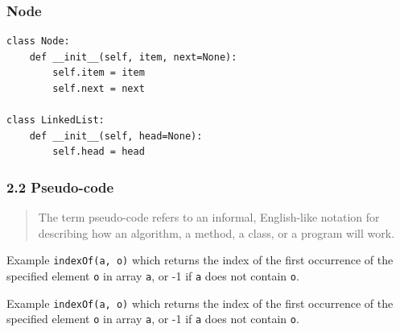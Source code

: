 \documentclass[aspectratio=169, 14pt]{beamer}
\begin{document}
\begin{frame}[fragile]
    \frametitle{Node}

    \begin{verbatim}
class Node:
    def __init__(self, item, next=None):
        self.item = item
        self.next = next

class LinkedList:
    def __init__(self, head=None):
        self.head = head
    \end{verbatim}
\end{frame}


\begin{frame}
    \frametitle{2.2 Pseudo-code}

    \begin{quote}
        The term \alert{pseudo-code} refers to an informal, English-like notation for describing how an algorithm, a method, a class, or a program will work.
    \end{quote}

    \begin{exampleblock}{Example}
        \texttt{indexOf(a, o)} which returns the index of the first occurrence of the specified element \texttt{o} in array \texttt{a}, or -1 if \texttt{a} does not contain \texttt{o}. 
    \end{exampleblock}
\end{frame}

\begin{frame}[fragile]

    \begin{exampleblock}{Example}
        \texttt{indexOf(a, o)} which returns the index of the first occurrence of the specified element \texttt{o} in array \texttt{a}, or -1 if \texttt{a} does not contain \texttt{o}. 
    \end{exampleblock}

\pause
\end{frame}
\end{document}
